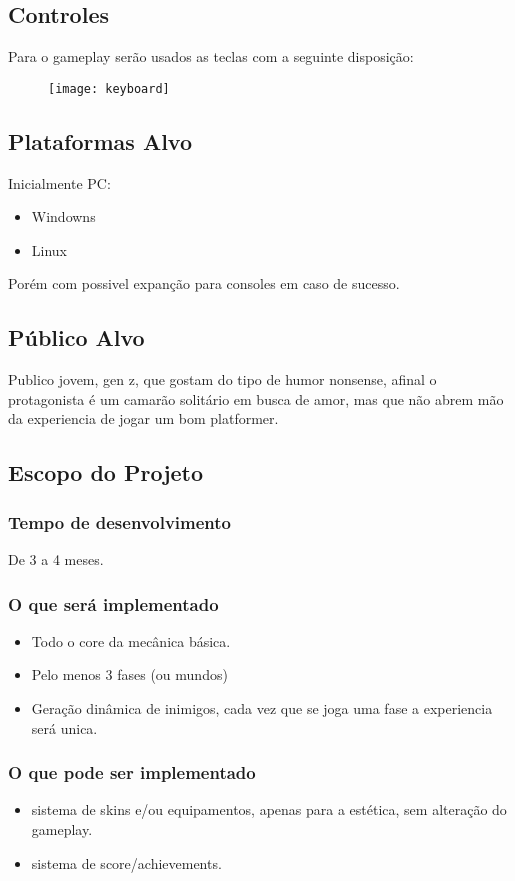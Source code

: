     \subsection{Controles}%
    Para o gameplay serão usados as teclas com a seguinte disposição:
    \begin{figure}[H]
        \texttt{[image: keyboard]}
    \centering
    \end{figure}

    \subsection{Plataformas Alvo}%
    Inicialmente PC:
        \begin{itemize}
            \item Windowns
            \item Linux
        \end{itemize}
    Porém com possivel expanção para consoles em caso de sucesso.
    \subsection{Público Alvo}%
        Publico jovem, gen z, que gostam do tipo de humor nonsense, afinal o protagonista é um camarão solitário em busca de amor, mas que não abrem mão da experiencia de jogar um bom platformer.

    \subsection{Escopo do Projeto}%
    \subsubsection{Tempo de desenvolvimento}
        De 3 a 4 meses.

    \subsubsection{O que será implementado}
        \begin{itemize}
            \item Todo o core da mecânica básica.
            \item Pelo menos 3 fases (ou mundos)
            \item Geração dinâmica de inimigos, cada vez que se joga uma fase a experiencia será unica.
        \end{itemize}
    \subsubsection{O que pode ser implementado}
        \begin{itemize}
            \item sistema de skins e/ou equipamentos, apenas para a estética, sem alteração do gameplay.
            \item sistema de score/achievements.
        \end{itemize}

